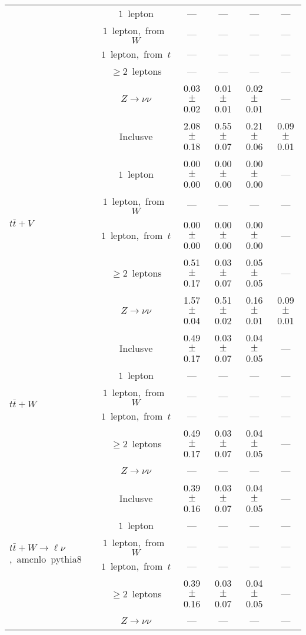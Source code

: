 \documentclass{article}
\begin{document}
\begin{longtable}{|l|c|c|c|c|c|}
 & $1$~lepton  & ---  & ---  & ---  & --- \\* 
 & $1$~lepton,~from~$W$  & ---  & ---  & ---  & --- \\* 
 & $1$~lepton,~from~$t$  & ---  & ---  & ---  & --- \\* 
 & $\ge2$~leptons  & ---  & ---  & ---  & --- \\* 
 & $Z\rightarrow\nu\nu$  & 0.03 $\pm$ 0.02  & 0.01 $\pm$ 0.01  & 0.02 $\pm$ 0.01  & --- \\* 
\hline 
\multirow{6}{*}{$t\bar{t}+V$} & Inclusve  & 2.08 $\pm$ 0.18  & 0.55 $\pm$ 0.07  & 0.21 $\pm$ 0.06  & 0.09 $\pm$ 0.01 \\* 
 & $1$~lepton  & 0.00 $\pm$ 0.00  & 0.00 $\pm$ 0.00  & 0.00 $\pm$ 0.00  & --- \\* 
 & $1$~lepton,~from~$W$  & ---  & ---  & ---  & --- \\* 
 & $1$~lepton,~from~$t$  & 0.00 $\pm$ 0.00  & 0.00 $\pm$ 0.00  & 0.00 $\pm$ 0.00  & --- \\* 
 & $\ge2$~leptons  & 0.51 $\pm$ 0.17  & 0.03 $\pm$ 0.07  & 0.05 $\pm$ 0.05  & --- \\* 
 & $Z\rightarrow\nu\nu$  & 1.57 $\pm$ 0.04  & 0.51 $\pm$ 0.02  & 0.16 $\pm$ 0.01  & 0.09 $\pm$ 0.01 \\* 
\hline 
\multirow{6}{*}{$t\bar{t}+W$} & Inclusve  & 0.49 $\pm$ 0.17  & 0.03 $\pm$ 0.07  & 0.04 $\pm$ 0.05  & --- \\* 
 & $1$~lepton  & ---  & ---  & ---  & --- \\* 
 & $1$~lepton,~from~$W$  & ---  & ---  & ---  & --- \\* 
 & $1$~lepton,~from~$t$  & ---  & ---  & ---  & --- \\* 
 & $\ge2$~leptons  & 0.49 $\pm$ 0.17  & 0.03 $\pm$ 0.07  & 0.04 $\pm$ 0.05  & --- \\* 
 & $Z\rightarrow\nu\nu$  & ---  & ---  & ---  & --- \\* 
\hline 
\multirow{6}{*}{$t\bar{t}+W{\rightarrow}{\ell}{\nu}$,~amcnlo~pythia8} & Inclusve  & 0.39 $\pm$ 0.16  & 0.03 $\pm$ 0.07  & 0.04 $\pm$ 0.05  & --- \\* 
 & $1$~lepton  & ---  & ---  & ---  & --- \\* 
 & $1$~lepton,~from~$W$  & ---  & ---  & ---  & --- \\* 
 & $1$~lepton,~from~$t$  & ---  & ---  & ---  & --- \\* 
 & $\ge2$~leptons  & 0.39 $\pm$ 0.16  & 0.03 $\pm$ 0.07  & 0.04 $\pm$ 0.05  & --- \\* 
 & $Z\rightarrow\nu\nu$  & ---  & ---  & ---  & --- \\* 

\end{longtable}
\end{document}
